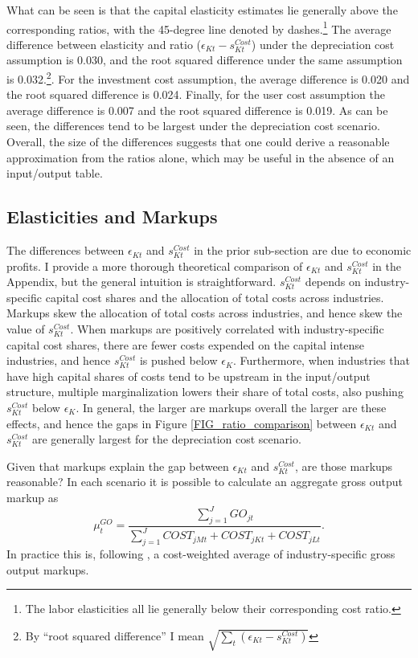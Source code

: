 \documentclass[11pt]{article}
\begin{document}
What can be seen is that the capital elasticity estimates lie generally above the corresponding ratios, with the 45-degree line denoted by dashes.\footnote{The labor elasticities all lie generally below their corresponding cost ratio.} The average difference between elasticity and ratio ($\epsilon_{Kt} - s^{Cost}_{Kt}$) under the depreciation cost assumption is 0.030, and the root squared difference under the same assumption is 0.032.\footnote{By ``root squared difference'' I mean $\sqrt{\sum_t (\epsilon_{Kt} - s^{Cost}_{Kt})}$}. For the investment cost assumption, the average difference is 0.020 and the root squared difference is 0.024. Finally, for the user cost assumption the average difference is 0.007 and the root squared difference is 0.019. As can be seen, the differences tend to be largest under the depreciation cost scenario. Overall, the size of the differences suggests that one could derive a reasonable approximation from the ratios alone, which may be useful in the absence of an input/output table.

\subsection{Elasticities and Markups}
The differences between $\epsilon_{Kt}$ and $s^{Cost}_{Kt}$ in the prior sub-section are due to economic profits. I provide a more thorough theoretical comparison of $\epsilon_{Kt}$ and $s^{Cost}_{Kt}$ in the Appendix, but the general intuition is straightforward. $s^{Cost}_{Kt}$ depends on industry-specific capital cost shares and the allocation of total costs across industries. Markups skew the allocation of total costs across industries, and hence skew the value of $s^{Cost}_{Kt}$. When markups are positively correlated with industry-specific capital cost shares, there are fewer costs expended on the capital intense industries, and hence $s^{Cost}_{Kt}$ is pushed below $\epsilon_K$. Furthermore, when industries that have high capital shares of costs tend to be upstream in the input/output structure, multiple marginalization lowers their share of total costs, also pushing $s^{Cost}_{Kt}$ below $\epsilon_K$. In general, the larger are markups overall the larger are these effects, and hence the gaps in Figure \ref{FIG_ratio_comparison} between $\epsilon_{Kt}$ and $s^{Cost}_{Kt}$ are generally largest for the depreciation cost scenario.

Given that markups explain the gap between $\epsilon_{Kt}$ and $s^{Cost}_{Kt}$, are those markups reasonable? In each scenario it is possible to calculate an aggregate gross output markup as
\begin{equation}
    \mu^{GO}_{t} = \frac{\sum_{j=1}^{J} GO_{jt}}{\sum_{j=1}^J COST_{jMt} + COST_{jKt} + COST_{jLt}}. \label{EQ_markup}
\end{equation}
In practice this is, following \cite{edmondetal2018}, a cost-weighted average of industry-specific gross output markups.
\end{document}
